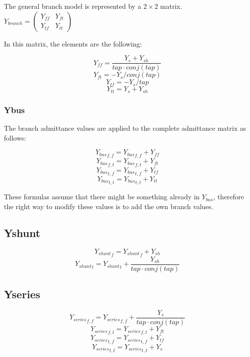\documentclass[11pt,fleqn]{book} %
\begin{document}
The general branch model is represented by a $2 \times 2$ matrix.
$
Y_{branch}=\left( \begin{array}{ccc}
Y_{ff} & Y_{ft} \\
Y_{tf} & Y_{tt} \end{array} \right)
$

In this matrix, the elements are the following:


$$Y_{ff} = \frac{Y_s + Y_{sh}}{tap \cdot conj(tap)}  $$
$$Y_{ft} = - Y_s / conj(tap)$$
$$Y_{tf} = - Y_s / tap$$
$$Y_{tt} = Y_s + Y_{sh}$$

\subsubsection{Ybus}

The branch admittance values are applied to the complete admittance matrix as follows:

$${Y_{bus}}_{f, f} = {Y_{bus}}_{f, f}  + Y_{ff}$$
$${Y_{bus}}_{f, t} = {Y_{bus}}_{f, t} + Y_{ft}$$
$${Y_{bus}}_{t, f} = {Y_{bus}}_{t, f} + Y_{tf}$$
$${Y_{bus}}_{t, t} = {Y_{bus}}_{t, t} + Y_{tt}$$


These formulas assume that there might be something already in $Y_{bus}$, therefore the right way to modify these values is to add the own branch values.


\subsection{Yshunt}
$${Y_{shunt}}_f = {Y_{shunt}}_f  + Y_{sh}$$
$${Y_{shunt}}_t = {Y_{shunt}}_t  + \frac{Y_{sh}}{tap \cdot conj(tap)}$$

\subsection{Yseries}

$${Y_{series}}_{f, f} = {Y_{series}}_{f, f}  + \frac{Y_{s}}{tap \cdot conj(tap)}$$
$${Y_{series}}_{f, t} = {Y_{series}}_{f, t} + Y_{ft}$$
$${Y_{series}}_{t, f} = {Y_{series}}_{t, f} + Y_{tf}$$
$${Y_{series}}_{t, t} = {Y_{series}}_{t, t} + Y_{s}$$
\end{document}
